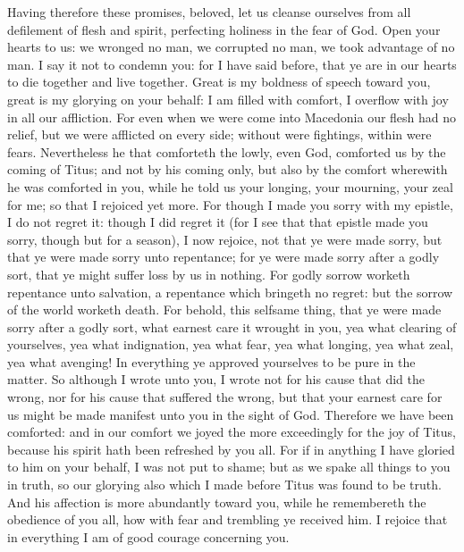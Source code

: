 Having therefore these promises, beloved, let us cleanse ourselves from all defilement of flesh and spirit, perfecting holiness in the fear of God.  Open your hearts to us: we wronged no man, we corrupted no man, we took advantage of no man. I say it not to condemn you: for I have said before, that ye are in our hearts to die together and live together. Great is my boldness of speech toward you, great is my glorying on your behalf: I am filled with comfort, I overflow with joy in all our affliction.  For even when we were come into Macedonia our flesh had no relief, but we were afflicted on every side; without were fightings, within were fears. Nevertheless he that comforteth the lowly, even God, comforted us by the coming of Titus; and not by his coming only, but also by the comfort wherewith he was comforted in you, while he told us your longing, your mourning, your zeal for me; so that I rejoiced yet more. For though I made you sorry with my epistle, I do not regret it: though I did regret it (for I see that that epistle made you sorry, though but for a season), I now rejoice, not that ye were made sorry, but that ye were made sorry unto repentance; for ye were made sorry after a godly sort, that ye might suffer loss by us in nothing. For godly sorrow worketh repentance unto salvation, a repentance which bringeth no regret: but the sorrow of the world worketh death. For behold, this selfsame thing, that ye were made sorry after a godly sort, what earnest care it wrought in you, yea what clearing of yourselves, yea what indignation, yea what fear, yea what longing, yea what zeal, yea what avenging! In everything ye approved yourselves to be pure in the matter. So although I wrote unto you, I wrote not for his cause that did the wrong, nor for his cause that suffered the wrong, but that your earnest care for us might be made manifest unto you in the sight of God. Therefore we have been comforted: and in our comfort we joyed the more exceedingly for the joy of Titus, because his spirit hath been refreshed by you all. For if in anything I have gloried to him on your behalf, I was not put to shame; but as we spake all things to you in truth, so our glorying also which I made before Titus was found to be truth. And his affection is more abundantly toward you, while he remembereth the obedience of you all, how with fear and trembling ye received him. I rejoice that in everything I am of good courage concerning you. 

